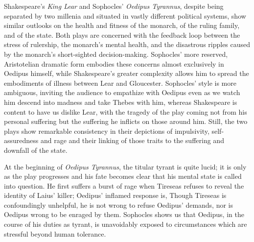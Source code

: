 \newcommand{\lear}{\textit{King Lear}}
\newcommand{\oedipus}{\textit{Oedipus Tyrannus}}
Shakespeare's \lear{} and Sophocles' \oedipus{}, despite being separated by two
millenia and situated in vastly different political systems, show similar
outlooks on the health and fitness of the monarch, of the ruling family, and of
the state. Both plays are concerned with the feedback loop between the stress of
rulership, the monarch's mental health, and the disastrous ripples caused by the
monarch's short-sighted decision-making. Sophocles' more reserved, Aristotelian
dramatic form embodies these concerns almost exclusively in Oedipus himself,
while Shakespeare's greater complexity allows him to spread the embodiments of
illness between Lear and Gloucester. Sophocles' style is more ambiguous,
inviting the audience to empathize with Oedipus even as we watch him descend
into madness and take Thebes with him, whereas Shakespeare is content to have us
dislike Lear, with the tragedy of the play coming not from his personal
suffering but the suffering he inflicts on those around him. Still, the two
plays show remarkable consistency in their depictions of impulsivity,
self-assuredness and rage and their linking of those traits to the suffering and
downfall of the state.



At the beginning of \oedipus{}, the titular tyrant is quite lucid; it is only as
the play progresses and his fate becomes clear that his mental state is called
into question. He first suffers a burst of rage when Tireseas refuses to reveal
the identity of Laius' killer; Oedipus' inflamed response is,
 Though
Tireseas is confoundingly unhelpful, he is not wrong to refuse Oedipus' demands,
nor is Oedipus wrong to be enraged by them. Sophocles shows us that Oedipus, in
the course of his duties as tyrant, is unavoidably exposed to circumstances
which are stressful beyond human tolerance.

